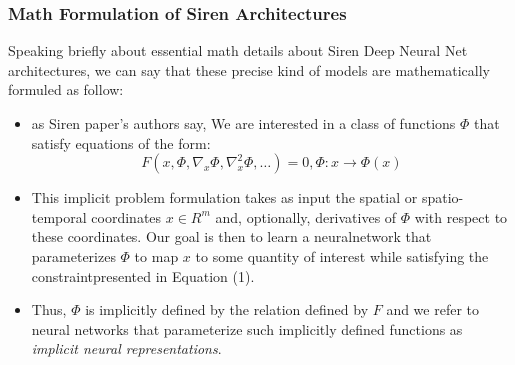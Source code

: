 



\begin{frame}
\frametitle{Math Formulation of Siren Architectures}
Speaking briefly about essential math details about Siren Deep Neural Net architectures, we can say that these precise kind of models are mathematically formuled as follow:

\begin{itemize}
\item as Siren paper's authors say, We are interested in a class of functions $\Phi$ that satisfy equations of the form: 
\begin{equation}
F(x, \Phi, \nabla_{x}\Phi, \nabla_{x}^{2}\Phi, \dots) = 0, \Phi:x\rightarrow\Phi(x)
\end{equation}
\item This implicit problem formulation takes as input the spatial or spatio-temporal coordinates $x \in R^{m}$ and, optionally, derivatives of $\Phi$ with respect to these coordinates. Our goal is then to learn a neuralnetwork that parameterizes $\Phi$ to map $x$ to some quantity of interest while satisfying the constraintpresented in Equation (1).
\item Thus, $\Phi$ is implicitly defined by the relation defined by $F$ and we refer to neural networks that parameterize such implicitly defined functions as \textit{implicit neural representations}.
\end{itemize}

\end{frame}
